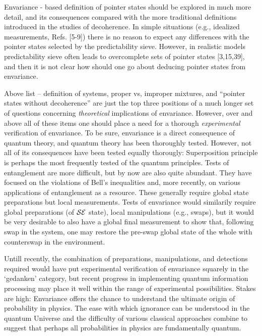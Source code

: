 \documentclass[aps,twocolumn,pra,epsfig]{revtex4}
\begin{document}

Envariance - based
definition of pointer states should be explored in much more detail, and its
consequences compared with the more traditional definitions introduced in the
studies of decoherence. In simple situations (e.g., idealized measurements,
Refs. [5-9]) there is no reason to expect any differences with the pointer
states selected by the predictability sieve. However, in realistic models
predictability sieve often leads to overcomplete sets of pointer states [3,15,39], 
and then it is not clear how should one go about
deducing pointer states from envariance.

Above list -- definition of systems, proper vs, improper mixtures, 
and ``pointer
states without decoherence'' are just the top three positions of a much longer
set of questions concerning {\it theoretical} implications of envariance.
However, over and above all of these items one should place a need for
a thorough {\it experimental} verification of envariance. To be sure,
envariance is a direct consequence of quantum theory, and quantum theory 
has been thoroughly tested. However, not all of
its consequences have been tested equally thorougly: Superposition principle
is perhaps the most frequently tested of the quantum principles. Tests of
entanglement are more difficult, but by now are also quite abundant. They have
focused on the violations of Bell's inequalities and, more recently, on various
applications of entanglement as a resource. These generally require 
global state
preparations but local measurements. Tests of envariance would similarily
require global preparations (of ${\cal SE}$ state), local manipulations
(e.g., swaps), but it would be very desirable to also have a global final
measurement to show that, following swap in the system, one may restore the
pre-swap global state of the whole with counterswap in the environment.

Untill recently, the combination of preparations, manipulations, and detections
required would have put experimental verification of envariance squarely in the
`gedanken' category, but recent progress in implementing quantum information
processing may place it well within the range of experimental possibilities.
Stakes are high: Envariance offers the chance to understand the ultimate origin
of probability in physics. The ease with which ignorance can be understood
in the quantum Universe and the difficulty of various classical approaches
combine to suggest that perhaps all probabilities in physics are fundamentally
quantum.
\end{document}
